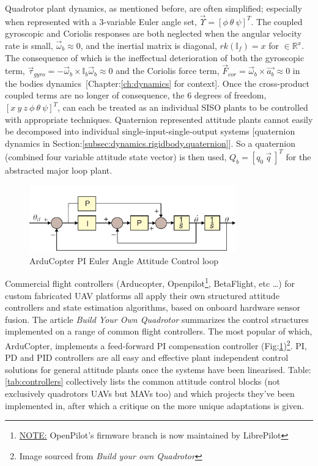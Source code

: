 Quadrotor plant dynamics, as mentioned before, are often simplified; especially when represented with a 3-variable Euler angle set, $\vec{\Upsilon} = [\phi ~\theta ~\psi]^T$. The coupled gyroscopic and Coriolis responses are both neglected when the angular velocity rate is small, $\vec{\omega}_b \approx 0$, and the inertial matrix is diagonal, $rk(\mathbb{I}_f)= x$ for $\in\mathbb{R}^x$. The consequence of which is the ineffectual deterioration of both the gyroscopic term, $\vec{\tau}_{gyro}=-\vec{\omega}_b \times \mathbb{I}_b\vec{\omega}_b \approx 0$ and the  Coriolis force term, $\vec{F}_{cor}=\vec{\omega}_b \times \vec{a_b} \approx 0$ in the bodies dynamics~[Chapter:\ref{ch:dynamics} for context]. Once the cross-product coupled terms are no longer of consequence, the 6 degrees of freedom, $[x ~y ~z ~\phi ~\theta ~\psi]^T$, can each be treated as an individual SISO plants to be controlled with appropriate techniques. Quaternion represented attitude plants cannot easily be decomposed into individual single-input-single-output systems [quaternion dynamics in Section:\ref{subsec:dynamics.rigidbody.quaternion}]. So a quaternion (combined four variable attitude state vector) is then used, $Q_b = [q_0 ~\vec{q}\>]^T$ for the abstracted major loop plant.
\par
\begin{figure}[hbtp]
\centering
\includegraphics[width=0.8\textwidth]{figs/arducopter-pi}
\caption{ArduCopter PI Euler Angle Attitude Control loop}
\label{fig:arducopter-pi}
\end{figure}
Commercial flight controllers (Arducopter\cite{arducoptersite}, Openpilot\cite{openpilotsite}\footnote{\underline{NOTE:} OpenPilot's firmware branch is now maintained by LibrePilot}, BetaFlight\cite{betaflight}, etc \ldots) for custom fabricated UAV platforms all apply their own structured attitude controllers and state estimation algorithms, based on onboard hardware sensor fusion. The article \emph{Build Your Own Quadrotor}\cite{buildyourownquad} summarizes the control structures implemented on a range of common flight controllers. The most popular of which, ArduCopter, implements a feed-forward PI compensation controller (Fig:\ref{fig:arducopter-pi})\footnote{Image sourced from \emph{Build your own Quadrotor}\cite{buildyourownquad}}.  PI, PD and PID controllers are all easy and effective plant independent control solutions for general attitude plants once the systems have been linearised. Table:\ref{tab:controllers} collectively lists the common attitude control blocks (not exclusively quadrotors UAVs but MAVs too) and which projects they've been implemented in, after which a critique on the more unique adaptations is given.
